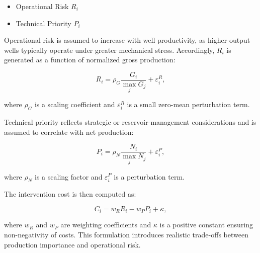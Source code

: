 \begin{itemize}
    \item Operational Risk $R_i$
    \item Technical Priority $P_i$
\end{itemize}

Operational risk is assumed to increase with well productivity, as higher-output wells typically operate under greater mechanical stress. Accordingly, $R_i$ is generated as a function of normalized gross production:

\[
R_i = \rho_G \frac{G_i}{\max_j G_j} + \varepsilon_i^R,
\]

where $\rho_G$ is a scaling coefficient and $\varepsilon_i^R$ is a small zero-mean perturbation term.

Technical priority reflects strategic or reservoir-management considerations and is assumed to correlate with net production:

\[
P_i = \rho_N \frac{N_i}{\max_j N_j} + \varepsilon_i^P,
\]

where $\rho_N$ is a scaling factor and $\varepsilon_i^P$ is a perturbation term.

The intervention cost is then computed as:

\[
C_i = w_R R_i - w_P P_i + \kappa,
\]

\noindent where $w_R$ and $w_P$ are weighting coefficients and $\kappa$ is a positive constant ensuring non-negativity of costs. This formulation introduces realistic trade-offs between production importance and operational risk.